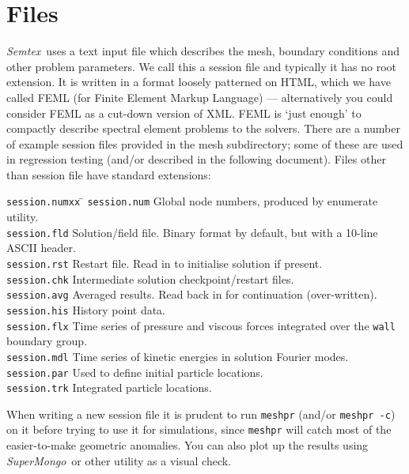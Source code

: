 \documentclass[11pt]{report}
\newcommand{\Semtex}{\emph{Semtex}} \newcommand{\Dog}{\emph{Dog}}
\newcommand{\SM}{\emph{SuperMongo}}
\begin{document}
\section{Files}

\Semtex\ uses a text input file which describes the mesh, boundary
conditions and other problem parameters.  We call this a session file
and typically it has no root extension.  It is written in a format
loosely patterned on HTML, which we have called FEML (for Finite
Element Markup Language) --- alternatively you could consider FEML as
a cut-down version of XML.  FEML is `just enough' to compactly
describe spectral element problems to the solvers.  There are a number
of example session files provided in the mesh subdirectory; some of
these are used in regression testing (and/or described in the
following document).  Files other than session file have standard
extensions:
\begin{tabbing}
\texttt{session.numxx} \= \kill
\texttt{session.num}  \>
        Global node numbers, produced by enumerate utility.\\
\texttt{session.fld}  \>
        Solution/field file.  Binary format by default,
        but with a 10-line ASCII header.\\
\texttt{session.rst}  \>
        Restart file. Read in to initialise solution if present.\\
\texttt{session.chk}  \>
        Intermediate solution checkpoint/restart files.\\
\texttt{session.avg} \> Averaged results. Read back in for
        continuation (over-written).\\
\texttt{session.his} \> History point data.\\
\texttt{session.flx} \> Time series of pressure and viscous forces
        integrated over the \texttt{wall} boundary group.\\
\texttt{session.mdl} \> Time series of kinetic energies
        in solution Fourier modes.\\
\texttt{session.par} \> Used to define initial particle locations.\\
\texttt{session.trk} \> Integrated particle locations.\\
\end{tabbing}
When writing a new session file it is prudent to run \texttt{meshpr}
(and/or \texttt{meshpr -c}) on it before trying to use it for
simulations, since \texttt{meshpr} will catch most of the easier-to-make
geometric anomalies.  You can also plot up the results using \SM\ or
other utility as a visual check.
\end{document}
